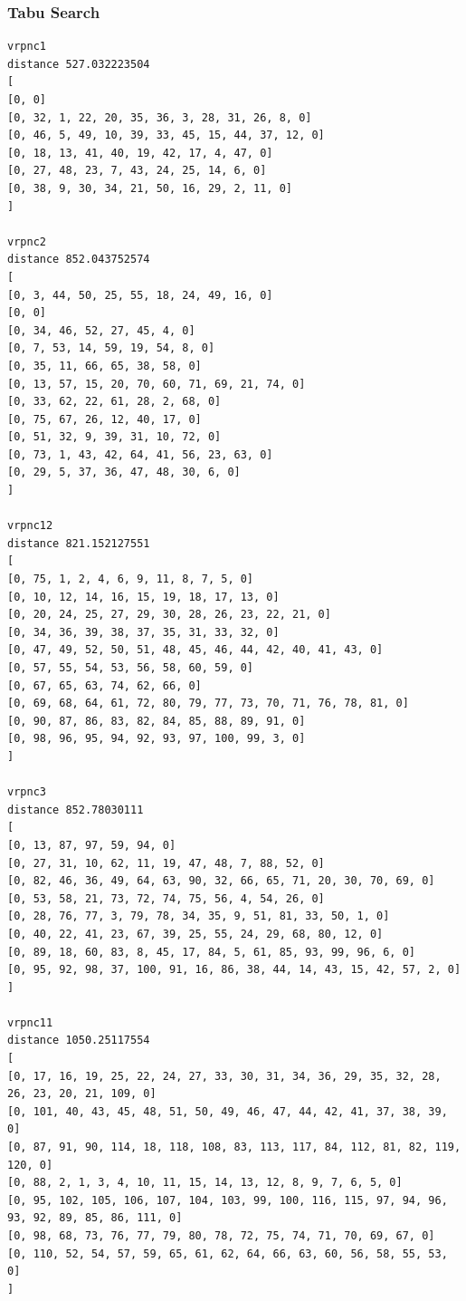 \documentclass{article} %
\begin{document}
\subsubsection{Tabu Search}
\begin{lstlisting}[breaklines, basicstyle=\tiny]
vrpnc1
distance 527.032223504
[
[0, 0]
[0, 32, 1, 22, 20, 35, 36, 3, 28, 31, 26, 8, 0]
[0, 46, 5, 49, 10, 39, 33, 45, 15, 44, 37, 12, 0]
[0, 18, 13, 41, 40, 19, 42, 17, 4, 47, 0]
[0, 27, 48, 23, 7, 43, 24, 25, 14, 6, 0]
[0, 38, 9, 30, 34, 21, 50, 16, 29, 2, 11, 0]
]

vrpnc2
distance 852.043752574
[
[0, 3, 44, 50, 25, 55, 18, 24, 49, 16, 0]
[0, 0]
[0, 34, 46, 52, 27, 45, 4, 0]
[0, 7, 53, 14, 59, 19, 54, 8, 0]
[0, 35, 11, 66, 65, 38, 58, 0]
[0, 13, 57, 15, 20, 70, 60, 71, 69, 21, 74, 0]
[0, 33, 62, 22, 61, 28, 2, 68, 0]
[0, 75, 67, 26, 12, 40, 17, 0]
[0, 51, 32, 9, 39, 31, 10, 72, 0]
[0, 73, 1, 43, 42, 64, 41, 56, 23, 63, 0]
[0, 29, 5, 37, 36, 47, 48, 30, 6, 0]
]

vrpnc12
distance 821.152127551
[
[0, 75, 1, 2, 4, 6, 9, 11, 8, 7, 5, 0]
[0, 10, 12, 14, 16, 15, 19, 18, 17, 13, 0]
[0, 20, 24, 25, 27, 29, 30, 28, 26, 23, 22, 21, 0]
[0, 34, 36, 39, 38, 37, 35, 31, 33, 32, 0]
[0, 47, 49, 52, 50, 51, 48, 45, 46, 44, 42, 40, 41, 43, 0]
[0, 57, 55, 54, 53, 56, 58, 60, 59, 0]
[0, 67, 65, 63, 74, 62, 66, 0]
[0, 69, 68, 64, 61, 72, 80, 79, 77, 73, 70, 71, 76, 78, 81, 0]
[0, 90, 87, 86, 83, 82, 84, 85, 88, 89, 91, 0]
[0, 98, 96, 95, 94, 92, 93, 97, 100, 99, 3, 0]
]

vrpnc3
distance 852.78030111
[
[0, 13, 87, 97, 59, 94, 0]
[0, 27, 31, 10, 62, 11, 19, 47, 48, 7, 88, 52, 0]
[0, 82, 46, 36, 49, 64, 63, 90, 32, 66, 65, 71, 20, 30, 70, 69, 0]
[0, 53, 58, 21, 73, 72, 74, 75, 56, 4, 54, 26, 0]
[0, 28, 76, 77, 3, 79, 78, 34, 35, 9, 51, 81, 33, 50, 1, 0]
[0, 40, 22, 41, 23, 67, 39, 25, 55, 24, 29, 68, 80, 12, 0]
[0, 89, 18, 60, 83, 8, 45, 17, 84, 5, 61, 85, 93, 99, 96, 6, 0]
[0, 95, 92, 98, 37, 100, 91, 16, 86, 38, 44, 14, 43, 15, 42, 57, 2, 0]
]

vrpnc11
distance 1050.25117554
[
[0, 17, 16, 19, 25, 22, 24, 27, 33, 30, 31, 34, 36, 29, 35, 32, 28, 26, 23, 20, 21, 109, 0]
[0, 101, 40, 43, 45, 48, 51, 50, 49, 46, 47, 44, 42, 41, 37, 38, 39, 0]
[0, 87, 91, 90, 114, 18, 118, 108, 83, 113, 117, 84, 112, 81, 82, 119, 120, 0]
[0, 88, 2, 1, 3, 4, 10, 11, 15, 14, 13, 12, 8, 9, 7, 6, 5, 0]
[0, 95, 102, 105, 106, 107, 104, 103, 99, 100, 116, 115, 97, 94, 96, 93, 92, 89, 85, 86, 111, 0]
[0, 98, 68, 73, 76, 77, 79, 80, 78, 72, 75, 74, 71, 70, 69, 67, 0]
[0, 110, 52, 54, 57, 59, 65, 61, 62, 64, 66, 63, 60, 56, 58, 55, 53, 0]
]


\end{lstlisting}
\end{document}
